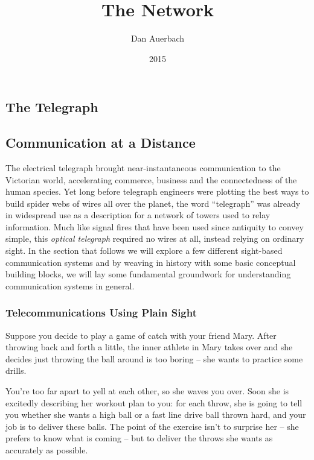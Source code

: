 \documentclass[UTF8]{book}
\begin{document}
\begin{CJK}{UTF8}{gbsn}

\title{The Network}
\author{Dan Auerbach}
\date{2015}
\maketitle

\part{The Telegraph}

\chapter{Communication at a Distance}

The electrical telegraph brought near-instantaneous communication to the Victorian world, accelerating commerce, business and the connectedness of the human species. Yet long before telegraph engineers were plotting the best ways to build spider webs of wires all over the planet, the word ``telegraph'' was already in widespread use as a description for a network of towers used to relay information. Much like signal fires that have been used since antiquity to convey simple, this \emph{optical telegraph} required no wires at all, instead relying on ordinary sight. In the section that follows we will explore a few different sight-based communication systems and by weaving in history with some basic conceptual building blocks, we will lay some fundamental groundwork for understanding communication systems in general.

\section{Telecommunications Using Plain Sight}

Suppose you decide to play a game of catch with your friend Mary. After throwing back and forth a little, the inner athlete in Mary takes over and she decides just throwing the ball around is too boring -- she wants to practice some drills.

You're too far apart to yell at each other, so she waves you over. Soon she is excitedly describing her workout plan to you: for each throw, she is going to tell you whether she wants a high ball or a fast line drive ball thrown hard, and your job is to deliver these balls. The point of the exercise isn't to surprise her -- she prefers to know what is coming -- but to deliver the throws she wants as accurately as possible.


\end{CJK}
\end{document}
